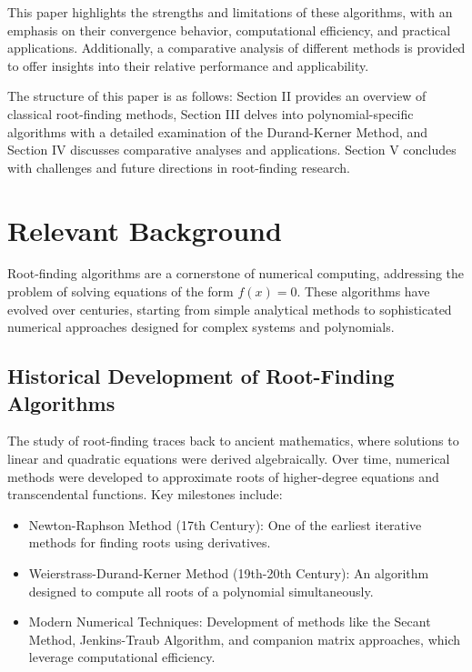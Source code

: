 \documentclass[10pt]{IEEEtran}
\begin{document}
This paper highlights the strengths and limitations of these algorithms, with an emphasis on their convergence behavior, computational efficiency, and practical applications. Additionally, a comparative analysis of different methods is provided to offer insights into their relative performance and applicability.

The structure of this paper is as follows: Section II provides an overview of classical root-finding methods, Section III delves into polynomial-specific algorithms with a detailed examination of the Durand-Kerner Method, and Section IV discusses comparative analyses and applications. Section V concludes with challenges and future directions in root-finding research.



\section{Relevant Background}
Root-finding algorithms are a cornerstone of numerical computing, addressing the problem of solving equations of the form $f(x) = 0$. These algorithms have evolved over centuries, starting from simple analytical methods to sophisticated numerical approaches designed for complex systems and polynomials.

\subsection{Historical Development of Root-Finding Algorithms}
The study of root-finding traces back to ancient mathematics, where solutions to linear and quadratic equations were derived algebraically. Over time, numerical methods were developed to approximate roots of higher-degree equations and transcendental functions. Key milestones include:
\begin{itemize}
    \item Newton-Raphson Method (17th Century): One of the earliest iterative methods for finding roots using derivatives.
    \item Weierstrass-Durand-Kerner Method (19th-20th Century): An algorithm designed to compute all roots of a polynomial simultaneously.
    \item Modern Numerical Techniques: Development of methods like the Secant Method, Jenkins-Traub Algorithm, and companion matrix approaches, which leverage computational efficiency.
\end{itemize}
\end{document}
